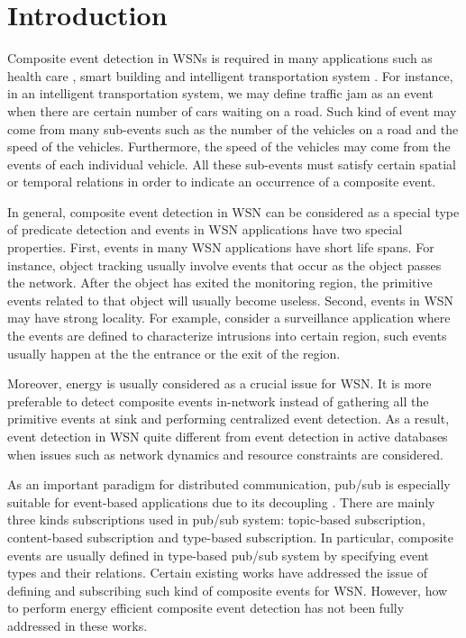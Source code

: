 \section{Introduction}
\label{sec:introduction}
Composite event \cite{jector} detection in WSNs is required in many applications such as health care \cite{lo:ban}, smart building \cite{lynch:shm} and intelligent transportation system \cite{klein:its}. For instance, in an intelligent transportation system, we may define traffic jam as an event when there are certain number of cars waiting on a road. Such kind of event may come from many sub-events such as the number of the vehicles on a road and the speed of the vehicles. Furthermore, the speed of the vehicles may come from the events of each individual vehicle. All these sub-events must satisfy certain spatial or temporal relations in order to indicate an occurrence of a composite event.

In general, composite event detection in WSN can be considered as a special type of predicate detection and events in WSN applications have two special properties. First, events in many WSN applications have short life spans. For instance, object tracking usually involve events that occur as the object passes the network. After the object has exited the monitoring region, the primitive events related to that object will usually become useless. Second, events in WSN may have strong locality.  For example, consider a surveillance application where the events are defined to characterize intrusions into certain region, such events usually happen at the the entrance or the exit of the region. 

Moreover, energy is usually considered as a crucial issue for WSN. It is more preferable to detect composite events in-network instead of gathering all the primitive events at sink and performing centralized event detection. As a result, event detection in WSN quite different from event detection in active databases \cite{samos} when issues such as network dynamics and resource constraints are considered.

As an important paradigm for distributed communication, pub/sub is especially suitable for event-based applications due to its decoupling \cite{facespubsub}. There are mainly three kinds subscriptions used in pub/sub system: topic-based subscription, content-based subscription and type-based subscription. In particular, composite events are usually defined in type-based pub/sub system by specifying event types and their relations. Certain existing works \cite{lai:psware} have addressed the issue of defining and subscribing such kind of composite events for WSN. However, how to perform energy efficient composite event detection has not been fully addressed in these works.

